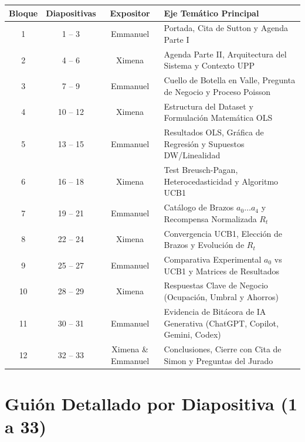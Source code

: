 \documentclass[11pt, a4paper]{article}
\begin{document}
\begin{table}[h!]
\centering
\small
\begin{tabularx}{\textwidth}{c c c X}
\toprule
\textbf{Bloque} & \textbf{Diapositivas} & \textbf{Expositor} & \textbf{Eje Temático Principal} \\
\midrule
1 & 1 -- 3 & Emmanuel & Portada, Cita de Sutton y Agenda Parte I \\
2 & 4 -- 6 & Ximena & Agenda Parte II, Arquitectura del Sistema y Contexto UPP \\
3 & 7 -- 9 & Emmanuel & Cuello de Botella en Valle, Pregunta de Negocio y Proceso Poisson \\
4 & 10 -- 12 & Ximena & Estructura del Dataset y Formulación Matemática OLS \\
5 & 13 -- 15 & Emmanuel & Resultados OLS, Gráfica de Regresión y Supuestos DW/Linealidad \\
6 & 16 -- 18 & Ximena & Test Breusch-Pagan, Heterocedasticidad y Algoritmo UCB1 \\
7 & 19 -- 21 & Emmanuel & Catálogo de Brazos $a_0 \dots a_4$ y Recompensa Normalizada $R_t$ \\
8 & 22 -- 24 & Ximena & Convergencia UCB1, Elección de Brazos y Evolución de $R_t$ \\
9 & 25 -- 27 & Emmanuel & Comparativa Experimental $a_0$ vs UCB1 y Matrices de Resultados \\
10 & 28 -- 29 & Ximena & Respuestas Clave de Negocio (Ocupación, Umbral y Ahorros) \\
11 & 30 -- 31 & Emmanuel & Evidencia de Bitácora de IA Generativa (ChatGPT, Copilot, Gemini, Codex) \\
12 & 32 -- 33 & Ximena \& Emmanuel & Conclusiones, Cierre con Cita de Simon y Preguntas del Jurado \\
\bottomrule
\end{tabularx}
\end{table}

\newpage

\section{Guión Detallado por Diapositiva (1 a 33)}
\end{document}
